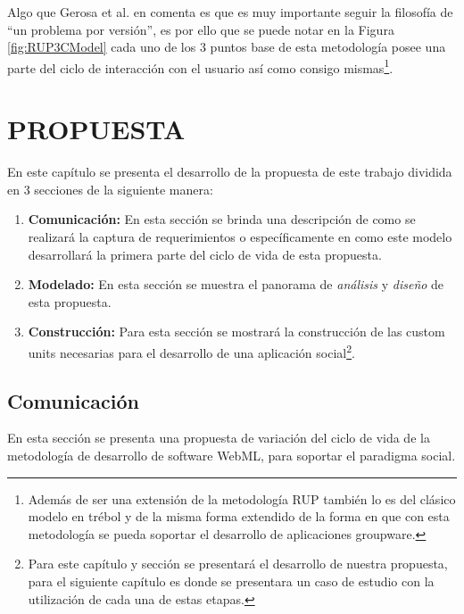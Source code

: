 \documentclass[oneside,12pt,a4paper]{memoir}%
\begin{document}
		
		Algo que Gerosa et al. en \cite{Gerosa2005} comenta es que es muy importante seguir la
		filosof\'ia de ``un problema por versi\'on'', es por ello que se puede notar en la
		Figura \ref{fig:RUP3CModel} cada uno de los $3$ puntos base de esta
		metodolog\'ia posee una parte del ciclo de interacci\'on con el usuario as\'i como
		consigo mismas\footnote{Adem\'as de ser una extensi\'on de la metodolog\'ia
		\ac{RUP} tambi\'en lo es del cl\'asico modelo en tr\'ebol y de la misma forma
		extendido de la forma en que con esta metodolog\'ia se pueda soportar el
		desarrollo de aplicaciones groupware.}.
		
\chapter{PROPUESTA}		   		
\label{chap:Proposal}
	En este cap\'itulo se presenta el desarrollo de la propuesta de este trabajo
	dividida en $3$ secciones de la siguiente manera:
	
	\begin{enumerate}
	  \item \textbf{Comunicaci\'on:} En esta secci\'on se brinda una descripci\'on
	  de como se realizar\'a la captura de requerimientos o espec\'ificamente  en como
	  este modelo desarrollar\'a la primera parte del ciclo de vida de esta
	  propuesta.
	  \item \textbf{Modelado:} En esta secci\'on se muestra el panorama de
	  \textit{an\'alisis} y \textit{dise\~no} de esta propuesta.
	  \item \textbf{Construcci\'on:} Para esta secci\'on se mostrar\'a la
	  construcci\'on de las custom units necesarias para el desarrollo de una
	  aplicaci\'on social\footnote{Para este cap\'itulo y secci\'on se
	  presentar\'a el desarrollo de nuestra propuesta, para
	  el siguiente cap\'itulo es donde se presentara un caso de estudio con la
	  utilizaci\'on de cada una de estas etapas.}.
	\end{enumerate}
	
	\section{Comunicaci\'on}
	\label{sec:communication}
	En esta secci\'on se presenta una propuesta de variaci\'on del ciclo
	de vida de la metodolog\'ia de desarrollo de software \ac{WebML}, para soportar
	el paradigma social.
	
\end{document}
